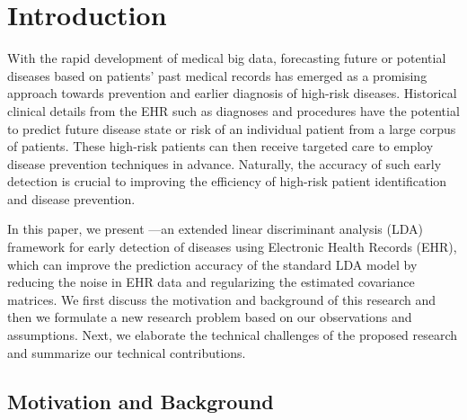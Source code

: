 \section{Introduction}

With the rapid development of medical big data, forecasting future or potential diseases based on patients' past medical records has emerged as a promising approach towards prevention and earlier diagnosis of high-risk diseases.
Historical clinical details from the EHR such as diagnoses and procedures have the potential to predict future disease state or risk of an individual patient from a large corpus of patients. These high-risk patients can then receive targeted care to employ disease prevention techniques in advance. Naturally, the accuracy of such early detection is crucial to improving the efficiency of high-risk patient identification and disease prevention.

In this paper, we present \TheName{}---an extended linear discriminant analysis (LDA)~\cite{fisher1936use,mclachlan2004discriminant} framework for early detection of diseases using Electronic Health Records (EHR), which can improve the prediction accuracy of the standard LDA model by reducing the noise in EHR data and regularizing the estimated covariance matrices. We first discuss the motivation and background of this research and then we formulate a new research problem based on our observations and assumptions. Next, we elaborate the technical challenges of the proposed research and summarize our technical contributions.
 

\subsection{Motivation and Background}

